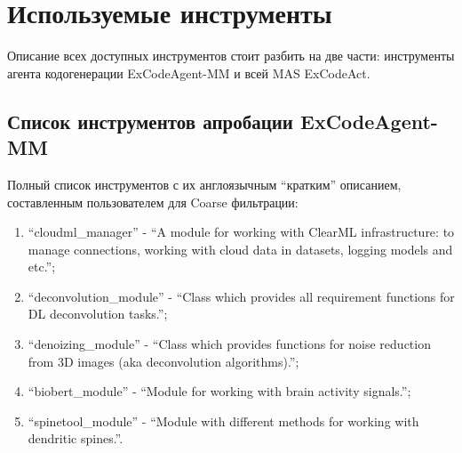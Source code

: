 \chapter{Используемые инструменты}\label{appendix-tools}							%

Описание всех доступных инструментов стоит разбить на две части: инструменты агента 
кодогенерации ExCodeAgent-MM и всей MAS ExCodeAct.

\section{Список инструментов апробации ExCodeAgent-MM}\label{appendix-tools:sec1}

Полный список инструментов с их англоязычным ``кратким'' описанием, составленным пользователем для 
Coarse фильтрации:
\begin{enumerate}
	\item ``cloudml\_manager'' - ``A module for working with ClearML infrastructure: 
to manage connections, working with cloud data in datasets, logging models and etc.'';
	\item ``deconvolution\_module'' - ``Class which provides all requirement functions for DL deconvolution tasks.'';
	\item ``denoizing\_module'' - ``Class which provides functions for noise reduction from 3D images 
(aka deconvolution algorithms).'';
	\item ``biobert\_module'' - ``Module for working with brain activity signals.'';
	\item ``spinetool\_module'' - ``Module with different methods for working with dendritic spines.''.
\end{enumerate}

